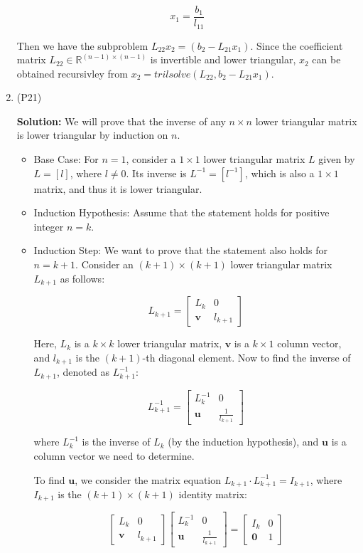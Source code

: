 \documentclass[12pt]{article}
\begin{document}
\begin{enumerate}[leftmargin=\labelsep]
$$x_1 = \frac{b_1}{l_{11}}$$

Then we have the subproblem \(L_{22} x_{2} = (b_{2} - L_{21} x_{1})\). Since the coefficient matrix $L_{22}\in \mathbb{R}^{(n-1)\times(n-1)}$
is invertible and lower triangular, $x_2$ can be obtained recursivley from $x_2 = trilsolve(L_{22},b_2 - L_{21}x_1)$.
\item (P21) 

\textbf{Solution:}
We will prove that the inverse of any \(n \times n\) lower triangular matrix is lower triangular by induction on \(n\).
\begin{itemize}
\item Base Case:
For \(n = 1\), consider a \(1 \times 1\) lower triangular matrix \(L\) given by \(L = [l]\), where \(l \neq 0\). Its inverse is \(L^{-1} = [l^{-1}]\), which is also a \(1 \times 1\) matrix, and thus it is lower triangular.

\item Induction Hypothesis:
Assume that the statement holds for positive integer \(n = k\).

\item Induction Step:
We want to prove that the statement also holds for \(n = k + 1\). Consider an \((k + 1) \times (k + 1)\) lower triangular matrix \(L_{k+1}\) as follows:

\[
L_{k+1} = \begin{bmatrix}
    L_k & 0 \\
    \mathbf{v} & l_{k+1}
\end{bmatrix}
\]

Here, \(L_k\) is a \(k \times k\) lower triangular matrix, \(\mathbf{v}\) is a \(k \times 1\) column vector, and \(l_{k+1}\) is the \((k+1)\)-th diagonal element. Now to find the inverse of \(L_{k+1}\), denoted as \(L_{k+1}^{-1}\):

\[
L_{k+1}^{-1} = \begin{bmatrix}
    L_k^{-1} & 0 \\
    \mathbf{u} & \frac{1}{l_{k+1}}
\end{bmatrix}
\]

where \(L_k^{-1}\) is the inverse of \(L_k\) (by the induction hypothesis), and \(\mathbf{u}\) is a column vector we need to determine.

To find \(\mathbf{u}\), we consider the matrix equation \(L_{k+1} \cdot L_{k+1}^{-1} = I_{k+1}\), where \(I_{k+1}\) is the \((k+1) \times (k+1)\) identity matrix:

\[
\begin{bmatrix}
    L_k & 0 \\
    \mathbf{v} & l_{k+1}
\end{bmatrix}
\begin{bmatrix}
    L_k^{-1} & 0 \\
    \mathbf{u} & \frac{1}{l_{k+1}}
\end{bmatrix}
=
\begin{bmatrix}
    I_k & 0 \\
    \mathbf{0} & 1
\end{bmatrix}
\]


\end{itemize}
\end{enumerate}
\end{document}

